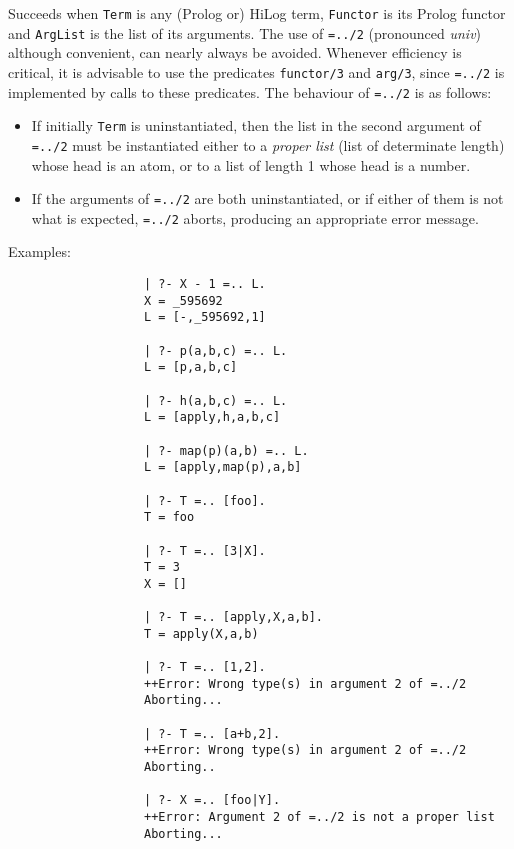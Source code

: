 \begin{description}
    Succeeds when {\tt Term} is any (Prolog or) HiLog term, {\tt Functor} is 
    its Prolog functor and {\tt ArgList} is the list of its arguments. 
    The use of {\tt =../2} (pronounced {\em univ}) although convenient, 
    can nearly always be avoided.
    Whenever efficiency is critical, it is advisable to use the
    predicates {\tt functor/3} and {\tt arg/3}, since {\tt =../2} is 
    implemented by calls to these predicates.  The behaviour of 
    {\tt =../2} is as follows:
    \begin{itemize}
    \item If initially {\tt Term} is uninstantiated, then the list in the 
          second argument of {\tt =../2} must be instantiated either to a
          {\em proper list} (list of determinate length) whose head is an 
          atom, or to a list of length 1 whose head is a number.
    \item If the arguments of {\tt =../2} are both uninstantiated, or if 
          either of them is not what is expected, {\tt =../2} aborts, 
          producing an appropriate error message.
    \end{itemize}

    Examples:
    {\footnotesize
     \begin{verbatim}
                   | ?- X - 1 =.. L.
                   X = _595692
                   L = [-,_595692,1]

                   | ?- p(a,b,c) =.. L.
                   L = [p,a,b,c]

                   | ?- h(a,b,c) =.. L.
                   L = [apply,h,a,b,c]

                   | ?- map(p)(a,b) =.. L.
                   L = [apply,map(p),a,b]

                   | ?- T =.. [foo].
                   T = foo

                   | ?- T =.. [3|X].
                   T = 3
                   X = []

                   | ?- T =.. [apply,X,a,b].
                   T = apply(X,a,b)

                   | ?- T =.. [1,2].
                   ++Error: Wrong type(s) in argument 2 of =../2
                   Aborting...

                   | ?- T =.. [a+b,2].
                   ++Error: Wrong type(s) in argument 2 of =../2
                   Aborting..

                   | ?- X =.. [foo|Y].
                   ++Error: Argument 2 of =../2 is not a proper list
                   Aborting...
     \end{verbatim}}


\end{description}
